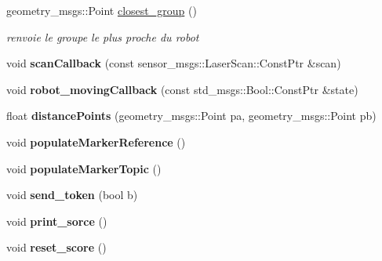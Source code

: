 \begin{DoxyCompactItemize}
\item 
geometry\+\_\+msgs\+::\+Point \hyperlink{classmoving__persons__detector_a56e54848546290d3dd0c06956763ee30}{closest\+\_\+group} ()
\begin{DoxyCompactList}\small\item\em renvoie le groupe le plus proche du robot \end{DoxyCompactList}\item 
void {\bfseries scan\+Callback} (const sensor\+\_\+msgs\+::\+Laser\+Scan\+::\+Const\+Ptr \&scan)\hypertarget{classmoving__persons__detector_a598d9cca5f0b1a46b784a9f888ae850d}{}\label{classmoving__persons__detector_a598d9cca5f0b1a46b784a9f888ae850d}

\item 
void {\bfseries robot\+\_\+moving\+Callback} (const std\+\_\+msgs\+::\+Bool\+::\+Const\+Ptr \&state)\hypertarget{classmoving__persons__detector_abeba4f8d5ceb0a1b3d6033dc5747fb21}{}\label{classmoving__persons__detector_abeba4f8d5ceb0a1b3d6033dc5747fb21}

\item 
float {\bfseries distance\+Points} (geometry\+\_\+msgs\+::\+Point pa, geometry\+\_\+msgs\+::\+Point pb)\hypertarget{classmoving__persons__detector_aa48199ec508ad8deadbbc063bb0aeb5b}{}\label{classmoving__persons__detector_aa48199ec508ad8deadbbc063bb0aeb5b}

\item 
void {\bfseries populate\+Marker\+Reference} ()\hypertarget{classmoving__persons__detector_a77dddf81140f2bdac9d2e601ab300e67}{}\label{classmoving__persons__detector_a77dddf81140f2bdac9d2e601ab300e67}

\item 
void {\bfseries populate\+Marker\+Topic} ()\hypertarget{classmoving__persons__detector_ad91162912d72e16901b739eb8a4a8d93}{}\label{classmoving__persons__detector_ad91162912d72e16901b739eb8a4a8d93}

\item 
void {\bfseries send\+\_\+token} (bool b)\hypertarget{classmoving__persons__detector_a6859b1e4f51fbd7e39c325acddfb1b60}{}\label{classmoving__persons__detector_a6859b1e4f51fbd7e39c325acddfb1b60}

\item 
void {\bfseries print\+\_\+sorce} ()\hypertarget{classmoving__persons__detector_a361fe077962345d7cba41cd160d3d52a}{}\label{classmoving__persons__detector_a361fe077962345d7cba41cd160d3d52a}

\item 
void {\bfseries reset\+\_\+score} ()\hypertarget{classmoving__persons__detector_afe1315f98a8619409542ccd29938a006}{}\label{classmoving__persons__detector_afe1315f98a8619409542ccd29938a006}


\end{DoxyCompactItemize}
